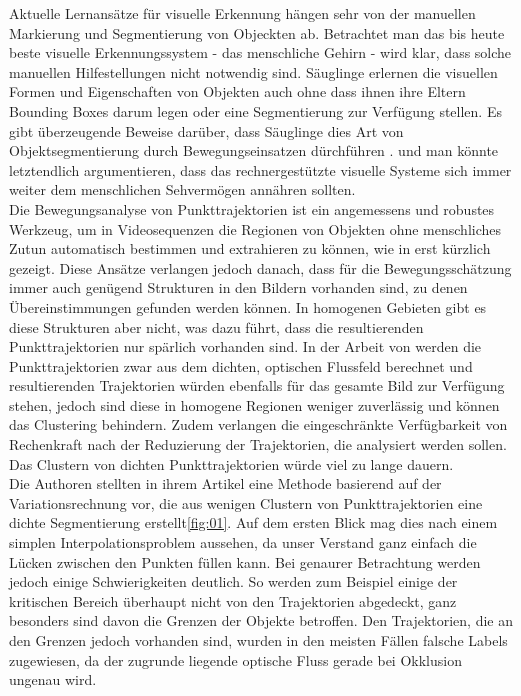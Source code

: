 Aktuelle Lernansätze für visuelle Erkennung hängen sehr von der manuellen Markierung und Segmentierung von Objeckten ab.
Betrachtet man das bis heute beste visuelle Erkennungssystem - das menschliche Gehirn - wird klar,
dass solche manuellen Hilfestellungen nicht notwendig sind. Säuglinge erlernen die visuellen Formen und
Eigenschaften von Objekten auch ohne dass ihnen ihre Eltern Bounding Boxes darum legen oder eine Segmentierung zur Verfügung stellen.
Es gibt überzeugende Beweise darüber, dass Säuglinge dies Art von Objektsegmentierung durch Bewegungseinsatzen dürchführen \cite{}.
und man könnte letztendlich argumentieren, dass das rechnergestützte visuelle Systeme sich immer weiter dem menschlichen Sehvermögen annähren sollten.
\\
Die Bewegungsanalyse von Punkttrajektorien ist ein angemessens und robustes Werkzeug, um in Videosequenzen die Regionen von Objekten ohne
menschliches Zutun automatisch bestimmen und extrahieren zu können, wie in \cite{} erst kürzlich gezeigt.
Diese Ansätze verlangen jedoch danach, dass für die Bewegungsschätzung immer auch genügend Strukturen in den Bildern vorhanden sind,
zu denen Übereinstimmungen gefunden werden können.
In homogenen Gebieten gibt es diese Strukturen aber nicht, was dazu führt, dass die resultierenden Punkttrajektorien nur spärlich vorhanden sind.
In der Arbeit von \cite{} werden die Punkttrajektorien zwar aus dem dichten, optischen Flussfeld berechnet und resultierenden Trajektorien würden
ebenfalls für das gesamte Bild zur Verfügung stehen, jedoch sind diese in homogene Regionen weniger zuverlässig und können das Clustering behindern.
Zudem verlangen die eingeschränkte Verfügbarkeit von Rechenkraft nach der Reduzierung der Trajektorien, die analysiert werden sollen.
Das Clustern von dichten Punkttrajektorien würde viel zu lange dauern.
\\
Die Authoren stellten in ihrem Artikel eine Methode basierend auf der Variationsrechnung vor,
die aus wenigen Clustern von Punkttrajektorien eine dichte Segmentierung erstellt\ref{fig:01}.
Auf dem ersten Blick mag dies nach einem simplen Interpolationsproblem aussehen, da unser Verstand ganz einfach die Lücken zwischen den Punkten füllen kann.
Bei genaurer Betrachtung werden jedoch einige Schwierigkeiten deutlich.
So werden zum Beispiel einige der kritischen Bereich überhaupt nicht von den Trajektorien abgedeckt,
ganz besonders sind davon die Grenzen der Objekte betroffen. Den Trajektorien, die an den Grenzen jedoch vorhanden sind,
wurden in den meisten Fällen falsche Labels zugewiesen, da der zugrunde liegende optische Fluss gerade bei Okklusion ungenau wird.
